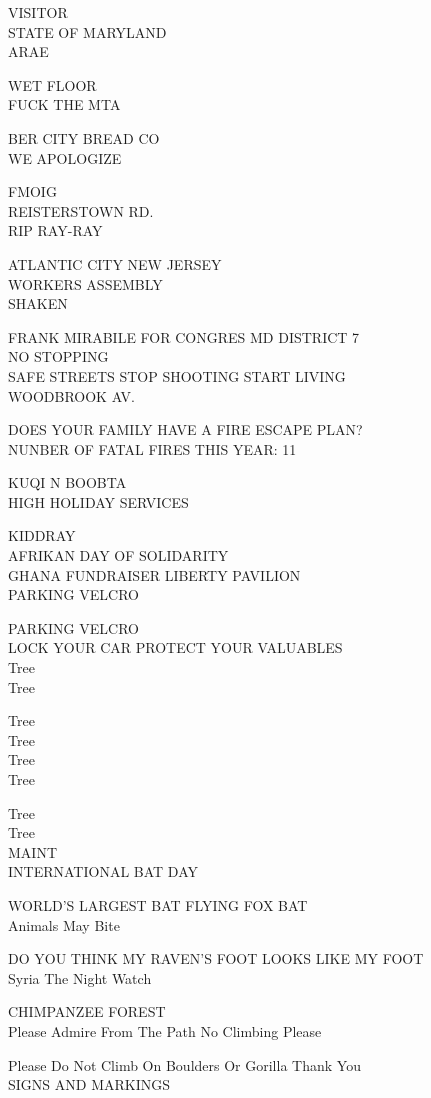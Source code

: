\documentclass[10pt,letterpaper]{article}
\begin{document}
VISITOR\\
STATE OF MARYLAND\\
ARAE

WET FLOOR\\
FUCK THE MTA

BER CITY BREAD CO\\
WE APOLOGIZE

FMOIG\\
REISTERSTOWN RD.\\
RIP RAY{-}RAY

ATLANTIC CITY NEW JERSEY\\
WORKERS ASSEMBLY\\
SHAKEN

FRANK MIRABILE FOR CONGRES MD DISTRICT 7\\
NO STOPPING\\
SAFE STREETS STOP SHOOTING START LIVING\\
WOODBROOK AV.

DOES YOUR FAMILY HAVE A FIRE ESCAPE PLAN?\\
NUNBER OF FATAL FIRES THIS YEAR: 11

KUQI N BOOBTA\\
HIGH HOLIDAY SERVICES

KIDDRAY\\
AFRIKAN DAY OF SOLIDARITY\\
GHANA FUNDRAISER LIBERTY PAVILION\\
PARKING VELCRO

PARKING VELCRO\\
LOCK YOUR CAR PROTECT YOUR VALUABLES\\
Tree\\
Tree

Tree\\
Tree\\
Tree\\
Tree

Tree\\
Tree\\
MAINT\\
INTERNATIONAL BAT DAY

WORLD'S LARGEST BAT FLYING FOX BAT\\
Animals May Bite

DO YOU THINK MY RAVEN'S FOOT LOOKS LIKE MY FOOT\\
Syria The Night Watch

CHIMPANZEE FOREST\\
Please Admire From The Path No Climbing Please

Please Do Not Climb On Boulders Or Gorilla Thank You\\
SIGNS AND MARKINGS
\end{document}
